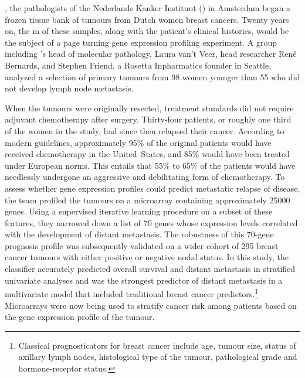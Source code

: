 
, the pathologists of the Nederlands Kanker
Instituut () in Amsterdam began a frozen tissue bank of tumours
from Dutch women breast cancers.  Twenty years on, the m of these
samples, along with the patient's clinical histories, would be the subject of a
page turning gene expression profiling experiment.  A group including
's head of molecular pathology, Laura van't Veer, head researcher
René Bernards, and Stephen Friend, a Rosetta Inpharmatics founder in Seattle,
analyzed a selection of primary tumours from 98 women younger than 55 who did
not develop lymph node metastasis.\cite{vant_veer_gene_2002}

When the tumours were originally resected, treatment standards did not require
adjuvant chemotherapy after surgery.  Thirty-four patients, or roughly one third
of the women in the study, had since then relapsed their cancer.  According to
modern guidelines, approximately 95\% of the original patients would have
received chemotherapy in the \mbox{United States}, and 85\% would have been
treated under European norms.  This entails that 55\% to 65\% of the patients
would have needlessly undergone an aggressive and debilitating form of
chemotherapy.  To assess whether gene expression profiles could predict
metastatic relapse of disease, the  team profiled the tumours on
a microarray containing approximately \num{25000} genes.  Using a supervised
iterative learning procedure on a subset of these features, they narrowed down a
list of 70 genes whose expression levels correlated with the development of
distant metastasis.  The robustness of this \mbox{70-gene} prognosis profile was
subsequently validated on a wider cohort of 295 breast cancer tumours with
either positive or negative nodal
status.\cite{van_de_vijver_gene-expression_2002} In this study, the classifier
accurately predicted overall survival and distant metastasis in stratified
univariate analyses and was the strongest predictor of distant metastasis in a
multivariate model that included traditional breast cancer
predictors.\footnote{Classical prognosticators for breast cancer include age,
  tumour size, status of axillary lymph nodes, histological type of the tumour,
  pathological grade and \mbox{hormone-receptor} status.}  Microarrays were now
being used to stratify cancer risk among patients based on the gene expression
profile of the tumour.

